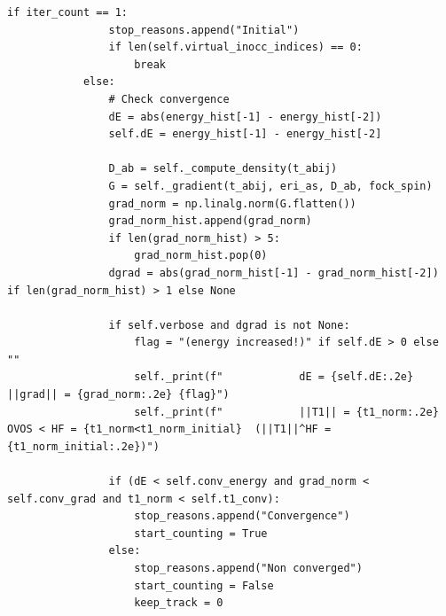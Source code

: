 \begin{lstlisting}[style=python, caption={...}, label=lst:full_code]
            if iter_count == 1:
                stop_reasons.append("Initial")
                if len(self.virtual_inocc_indices) == 0:
                    break
            else:
                # Check convergence
                dE = abs(energy_hist[-1] - energy_hist[-2])
                self.dE = energy_hist[-1] - energy_hist[-2]

                D_ab = self._compute_density(t_abij)
                G = self._gradient(t_abij, eri_as, D_ab, fock_spin)
                grad_norm = np.linalg.norm(G.flatten())
                grad_norm_hist.append(grad_norm)
                if len(grad_norm_hist) > 5:
                    grad_norm_hist.pop(0)
                dgrad = abs(grad_norm_hist[-1] - grad_norm_hist[-2]) if len(grad_norm_hist) > 1 else None

                if self.verbose and dgrad is not None:
                    flag = "(energy increased!)" if self.dE > 0 else ""
                    self._print(f"            dE = {self.dE:.2e}  ||grad|| = {grad_norm:.2e} {flag}")
                    self._print(f"            ||T1|| = {t1_norm:.2e}  OVOS < HF = {t1_norm<t1_norm_initial}  (||T1||^HF = {t1_norm_initial:.2e})")
                
                if (dE < self.conv_energy and grad_norm < self.conv_grad and t1_norm < self.t1_conv):
                    stop_reasons.append("Convergence")
                    start_counting = True
                else:
                    stop_reasons.append("Non converged")
                    start_counting = False
                    keep_track = 0


\end{lstlisting}
